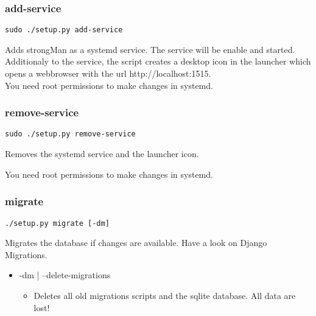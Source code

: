 \subsubsection{add-service}
\begin{lstlisting}[style=BashInputStyle]
	 sudo ./setup.py add-service
\end{lstlisting}
Adds strongMan as a systemd service. The service will be enable and started. Additionaly to the service, the script creates a desktop icon in the launcher which opens a webbrowser with the url http://localhost:1515.\\

You need root permissions to make changes in systemd.

\subsubsection{remove-service}
\begin{lstlisting}[style=BashInputStyle]
	 sudo ./setup.py remove-service
\end{lstlisting}
Removes the systemd service and the launcher icon.

You need root permissions to make changes in systemd.

\subsubsection{migrate}
\begin{lstlisting}[style=BashInputStyle]
	 ./setup.py migrate [-dm]
\end{lstlisting}
Migrates the database if changes are available. Have a look on Django Migrations.
\begin{itemize}
	\item -dm | --delete-migrations
	\begin{itemize}
	    \item Deletes all old migrations scripts and the sqlite database. All data are lost!
	\end{itemize}
\end{itemize}
